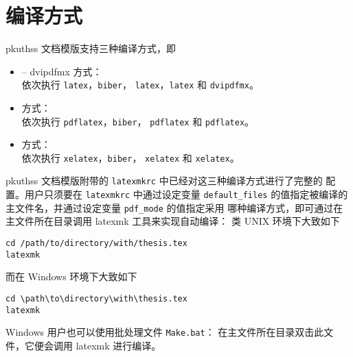 \section{编译方式}\label{sec:compile}

pkuthss 文档模版支持三种编译方式，即
\begin{itemize}
	\item {} -- dvipdfmx 方式：\\
		依次执行 \verb|latex|，\verb|biber|，%
		\verb|latex|，\verb|latex| 和 \verb|dvipdfmx|。
	\item {} 方式：\\
		依次执行 \verb|pdflatex|，\verb|biber|，%
		\verb|pdflatex| 和 \verb|pdflatex|。
	\item {} 方式：\\
		依次执行 \verb|xelatex|，\verb|biber|，%
		\verb|xelatex| 和 \verb|xelatex|。
\end{itemize}

pkuthss 文档模版附带的 \verb|latexmkrc| 中已经对这三种编译方式进行了完整的
配置。用户只须要在 \verb|latexmkrc| 中通过设定变量 \verb|default_files|
的值指定被编译的主文件名，并通过设定变量 \verb|pdf_mode| 的值指定采用
哪种编译方式，即可通过在主文件所在目录调用 latexmk 工具来实现自动编译：
类 UNIX 环境下大致如下
\begin{Verbatim}
cd /path/to/directory/with/thesis.tex
latexmk
\end{Verbatim}
而在 Windows 环境下大致如下
\begin{Verbatim}
cd \path\to\directory\with\thesis.tex
latexmk
\end{Verbatim}

Windows 用户也可以使用批处理文件 \verb|Make.bat|：
在主文件所在目录双击此文件，它便会调用 latexmk 进行编译。


